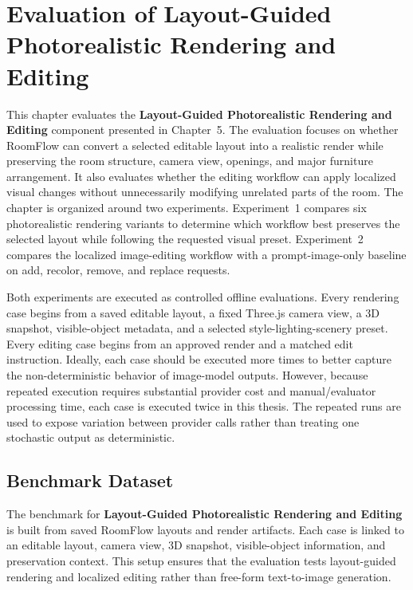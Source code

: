 \chapter{Evaluation of Layout-Guided Photorealistic Rendering and Editing}\label{chap:image-evaluation}

This chapter evaluates the \textbf{Layout-Guided Photorealistic Rendering and Editing} component presented in Chapter~5. The evaluation focuses on whether RoomFlow can convert a selected editable layout into a realistic render while preserving the room structure, camera view, openings, and major furniture arrangement. It also evaluates whether the editing workflow can apply localized visual changes without unnecessarily modifying unrelated parts of the room. The chapter is organized around two experiments. Experiment~1 compares six photorealistic rendering variants to determine which workflow best preserves the selected layout while following the requested visual preset. Experiment~2 compares the localized image-editing workflow with a prompt-image-only baseline on add, recolor, remove, and replace requests.

Both experiments are executed as controlled offline evaluations. Every rendering case begins from a saved editable layout, a fixed Three.js camera view, a 3D snapshot, visible-object metadata, and a selected style-lighting-scenery preset. Every editing case begins from an approved render and a matched edit instruction. Ideally, each case should be executed more times to better capture the non-deterministic behavior of image-model outputs. However, because repeated execution requires substantial provider cost and manual/evaluator processing time, each case is executed twice in this thesis. The repeated runs are used to expose variation between provider calls rather than treating one stochastic output as deterministic.

\section{Benchmark Dataset}\label{subsec:eval-image-benchmark-cases}

The benchmark for \textbf{Layout-Guided Photorealistic Rendering and Editing} is built from saved RoomFlow layouts and render artifacts. Each case is linked to an editable layout, camera view, 3D snapshot, visible-object information, and preservation context. This setup ensures that the evaluation tests layout-guided rendering and localized editing rather than free-form text-to-image generation.

